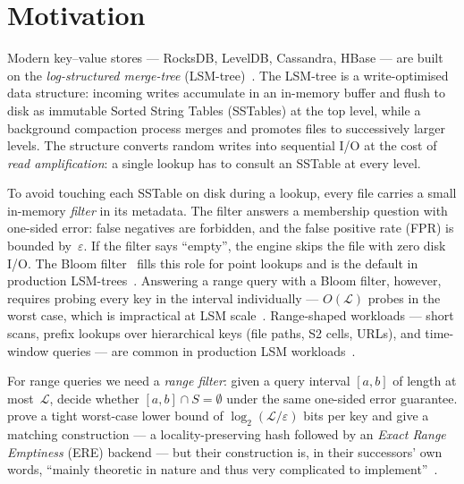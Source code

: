 \section{Motivation}
\label{sec:motivation}

Modern key--value stores --- RocksDB, LevelDB, Cassandra, HBase --- are built
on the \emph{log-structured merge-tree} (LSM-tree)~\citep{oneil1996lsm}.
The LSM-tree is a write-optimised data structure: incoming writes accumulate in an in-memory
buffer and flush to disk as immutable Sorted String Tables (SSTables)
at the top level, while a background compaction process merges and promotes
files to successively larger levels.
The structure converts random writes into
sequential I/O at the cost of \emph{read amplification}: a single lookup
has to consult an SSTable at every level.

To avoid touching each SSTable on disk during a lookup, every file carries a small in-memory
\emph{filter} in its metadata.
The filter answers a membership question
with one-sided error: false negatives are forbidden, and the false positive rate (FPR) is bounded by~$\varepsilon$.
If the filter says ``empty'', the engine
skips the file with zero disk I/O.
The Bloom filter~\citep{bloom1970space}
fills this role for point lookups and is the default in production
LSM-trees~\citep{monkey2017,dong2021rocksdb}.
Answering a range query with a Bloom filter, however, requires probing every key in the interval individually --- $O(\mathcal{L})$ probes in the worst case, which is impractical at LSM scale~\citep{zhang2018surf}.
Range-shaped workloads --- short scans, prefix lookups over hierarchical keys (file paths, S2 cells,
URLs), and time-window queries --- are common in production LSM workloads~\citep{cao2020facebook}.

For range queries we need a \emph{range filter}: given a query interval
$[a, b]$ of length at most~$\mathcal{L}$, decide whether $[a, b] \cap S = \emptyset$
under the same one-sided error guarantee.
\citet{goswami2015approximate} prove a tight worst-case lower bound of
$\log_2(\mathcal{L}/\varepsilon)$ bits per key and give a matching
construction --- a locality-preserving hash followed by an
\emph{Exact Range Emptiness} (ERE) backend --- but their construction
is, in their successors' own words, ``mainly theoretic in nature and
thus very complicated to implement''~\citep{grafite2024}.

